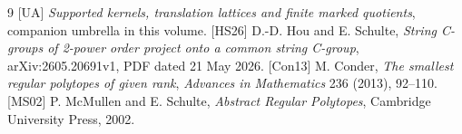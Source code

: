 \begin{thebibliography}{9}
[UA] \emph{Supported kernels, translation lattices and finite marked quotients},
companion umbrella in this volume.
[HS26] D.-D. Hou and E. Schulte,
\emph{String C-groups of 2-power order project onto a common string C-group},
arXiv:2605.20691v1, PDF dated 21 May 2026.
[Con13] M. Conder, \emph{The smallest regular polytopes of
given rank}, \emph{Advances in Mathematics} 236 (2013), 92--110.
[MS02] P. McMullen and E. Schulte,
\emph{Abstract Regular Polytopes}, Cambridge University Press, 2002.
\end{thebibliography}

